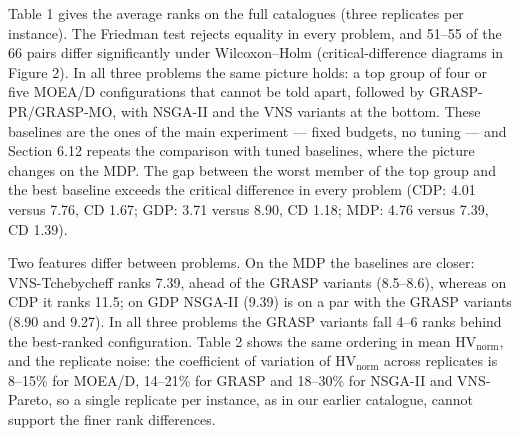 Table 1 gives the average ranks on the full catalogues (three replicates per instance). The Friedman test rejects equality in every problem, and 51--55 of the 66 pairs differ significantly under Wilcoxon--Holm (critical-difference diagrams in Figure 2). In all three problems the same picture holds: a top group of four or five MOEA/D configurations that cannot be told apart, followed by GRASP-PR/GRASP-MO, with NSGA-II and the VNS variants at the bottom. These baselines are the ones of the main experiment --- fixed budgets, no tuning --- and Section 6.12 repeats the comparison with tuned baselines, where the picture changes on the MDP. The gap between the worst member of the top group and the best baseline exceeds the critical difference in every problem (CDP: 4.01 versus 7.76, CD 1.67; GDP: 3.71 versus 8.90, CD 1.18; MDP: 4.76 versus 7.39, CD 1.39).

Two features differ between problems. On the MDP the baselines are closer: VNS-Tchebycheff ranks 7.39, ahead of the GRASP variants (8.5--8.6), whereas on CDP it ranks 11.5; on GDP NSGA-II (9.39) is on a par with the GRASP variants (8.90 and 9.27). In all three problems the GRASP variants fall 4--6 ranks behind the best-ranked configuration. Table 2 shows the same ordering in mean $\mathrm{HV}_{\mathrm{norm}}$, and the replicate noise: the coefficient of variation of $\mathrm{HV}_{\mathrm{norm}}$ across replicates is 8--15\% for MOEA/D, 14--21\% for GRASP and 18--30\% for NSGA-II and VNS-Pareto, so a single replicate per instance, as in our earlier catalogue, cannot support the finer rank differences.

